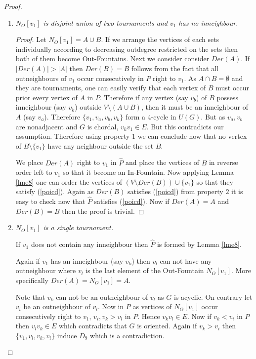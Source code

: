 \documentclass{article}
\theoremstyle{definition}
\numberwithin{equation}{section}
\begin{document}
\begin{proof}
\begin{enumerate}
\begin{proof}
Construction of $\hat{P}$ follows from Lemma \ref{lme8}.
\end{proof}

\item \textit{$N_{O}[v_{1}]$ is disjoint union of two tournaments and $v_{1}$ has no inneighbour.}




\begin{proof}
\noindent Let $N_{O}[v_{1}]=A\cup B$. If we arrange the vertices of each sets individually according to decreasing outdegree restricted on the sets then both of them become Out-Fountains. Next we consider consider $Der(A)$. If $|Der(A)|>|A|$ then $Der(B)=B$ follows from the fact that all outneighbours of $v_{1}$ occur consecutively in $P$ right to $v_{1}$. As $A\cap B=\emptyset$ and they are tournaments, one can easily verify that each vertex of $B$ must occur prior every vertex of $A$ in $P$. Therefore if any vertex (say $v_{b}$) of $B$ possess inneighbour (say $v_{k}$) outside $V\setminus (A\cup B)$, then it must be an inneighbour of $A$ (say $v_{a}$). Therefore $\{v_{1},v_{a},v_{b},v_{k}\}$ form a $4$-cycle in $U(G)$. But as $v_{a},v_{b}$ are nonadjacent and $G$ is chordal, $v_{k}v_{1}\in E$. But this contradicts our assumption. Therefore using property $1$ we can conclude now that no vertex of $B\setminus \{v_{1}\}$ have any neighbour outside the set $B$.

We place $Der(A)$ right to $v_{1}$ in $\hat{P}$ and place the vertices of $B$ in reverse order left to $v_{1}$ so that it become an In-Fountain. Now applying Lemma \ref{lme8} one can order the vertices of $(V\setminus Der(B))\cup \{v_{1}\}$ so that they satisfy (\ref{poicd}). Again as $Der(B)$ satisfies (\ref{poicd}) from property $2$ it is easy to check now that $\hat{P}$ satisfies (\ref{poicd}).
Now if $Der(A)=A$ and $Der(B)=B$ then the proof is trivial.    
\end{proof}

\item \textit{$N_{O}[v_{1}]$ is a single tournament.}

\noindent If $v_{1}$ does not contain any inneighbour then $\hat{P}$ is formed by Lemma \ref{lme8}.

\noindent Again if $v_{1}$ has an inneighbour (say $v_{k}$) then $v_{l}$ can not have any outneighbour where $v_{l}$ is the last element of the Out-Fountain $N_{O}[v_{1}]$. More specifically $Der(A)=N_{O}[v_{1}]=A$.

Note that $v_{k}$ can not be an outneighbour of $v_{l}$ as $G$ is acyclic. On contrary let $v_{i}$ be an outneighbour of $v_{l}$. Now in $P$ as vertices of $N_{O}[v_{1}]$ occur consecutively right to $v_{1}$, $v_{i},v_{k}>v_{l}$ in $P$. Hence $v_{k}v_{l}\in E$. Now if $v_{k}<v_{i}$ in $P$ then $v_{l}v_{k}\in E$ which contradicts that $G$ is oriented. Again if $v_{k}>v_{i}$ then $\{v_{1},v_{l},v_{k},v_{i}\}$ induce $D_{9}$ which is a contradiction.



\end{enumerate}
\end{proof}
\end{document}
